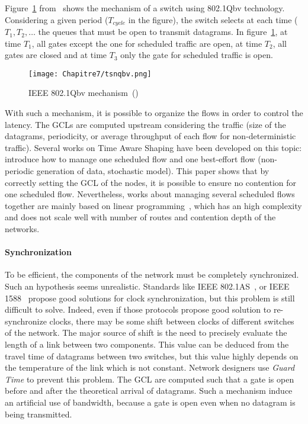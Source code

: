 Figure~\ref{fig:tsnqbv} from~\cite{durr2016no} shows the mechanism of a switch using 802.1Qbv technology. Considering a given period ($T_{cycle}$ in the figure), the switch selects at each time ($T_1 , T_2 , \ldots$ the queues that must be open to transmit datagrams. In figure~\ref{fig:tsnqbv}, at time $T_1$, all gates except the one for scheduled traffic are open, at time $T_2$, all gates are closed and at time $T_3$ only the gate for scheduled traffic is open.

  \begin{figure}
  \begin{center}
  \texttt{[image: Chapitre7/tsnqbv.png]}
  \end{center}
  \caption{IEEE 802.1Qbv mechanism~(\cite{durr2016no})}\label{fig:tsnqbv}
  \end{figure}
      
With such a mechanism, it is possible to organize the flows in order to control the latency. The GCLs are computed upstream considering the traffic (size of the datagrams, periodicity, or average throughput of each flow for non-deterministic traffic). Several works on Time Aware Shaping have been developed on this topic: \cite{al2017modeling} introduce how to manage one scheduled flow and one best-effort flow (non-periodic generation of data, stochastic model). This paper shows that by correctly setting the GCL of the nodes, it is possible to ensure no contention for one scheduled flow. Nevertheless, works about managing several scheduled flows together are mainly based on linear programming~\cite{steiner2018traffic,silviu2017,nayak2017incremental,naresh2016}, which has an high complexity and does not scale well with number of routes and contention depth of the networks.

\paragraph{Synchronization}
To be efficient, the components of the network must be completely synchronized. Such an hypothesis seems unrealistic. Standards like IEEE 802.1AS~\cite{5741898}, or IEEE 1588~\cite{4579760} propose good solutions for clock synchronization, but this problem is still difficult to solve. Indeed, even if those protocols propose good solution to re-synchronize clocks, there may be some shift between clocks of different switches of the network. The major source of shift is the need to precisely evaluate the length of a link between two components. This value can be deduced from the travel time of datagrams between two switches, but this value highly depends on the temperature of the link which is not constant. Network designers use {\em Guard Time} to prevent this problem. The GCL are computed such that a gate is open before and after the theoretical arrival of datagrams. Such a mechanism induce an artificial use of bandwidth, because a gate is open even when no datagram is being transmitted.

